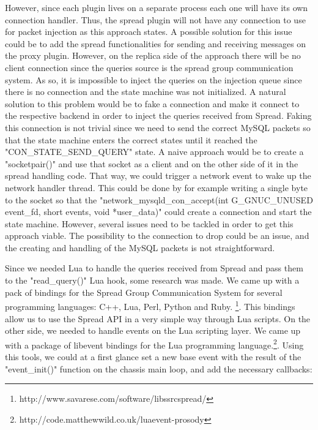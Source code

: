 However, since each plugin lives on a separate process each one will have its own connection handler. Thus, the spread plugin will not have any connection to use for packet injection as this approach states. A possible solution for this issue could be to add the spread functionalities for sending and receiving messages on the proxy plugin. However, on the replica side of the approach there will be no client connection since the queries source is the spread group communication system. As so, it is impossible to inject the queries on the injection queue since there is no connection and the state machine was not initialized. A natural solution to this problem would be to fake a connection and make it connect to the respective backend in order to inject the queries received from Spread.
Faking this connection is not trivial since we need to send the correct MySQL packets so that the state machine enters the correct states until it reached the "CON\_STATE\_SEND\_QUERY" state. A naive approach would be to create a "socketpair()" and use that socket as a client and on the other side of it in the spread handling code. That way, we could trigger a network event to wake up the network handler thread. This could be done by for example writing a single byte to the socket so that the "network\_mysqld\_con\_accept(int G\_GNUC\_UNUSED event\_fd, short events, void *user\_data)" could create a connection and start the state machine. However, several issues need to be tackled in order to get this approach viable. The possibility to the connection to drop could be an issue, and the creating and handling of the MySQL packets is not straightforward.




Since we needed Lua to handle the queries received from Spread and pass them to the "read\_query()" Lua hook, some research was made. We came up with a pack of bindings for the Spread Group Communication System for several programming languages: C++, Lua, Perl, Python and Ruby. \footnote{http://www.savarese.com/software/libssrcspread/}. This bindings allow us to use the Spread API in a very simple way through Lua scripts. 
On the other side, we needed to handle events on the Lua scripting layer. We came up with a package of libevent bindings for the Lua programming language.\footnote{http://code.matthewwild.co.uk/luaevent-prosody}.
Using this tools, we could at a first glance set a new base event with the result of the "event\_init()" function on the chassis main loop, and add the necessary callbacks:\\

